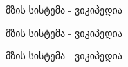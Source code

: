 \documentclass{article}
\begin{document}
\geofontipa მზის სისტემა - ვიკიპედია

\geofontiso მზის სისტემა - ვიკიპედია

\geofontpkb მზის სისტემა - ვიკიპედია


%
%            
%            
%            
%
%
%
%
%            
%            
%            
\end{document}
